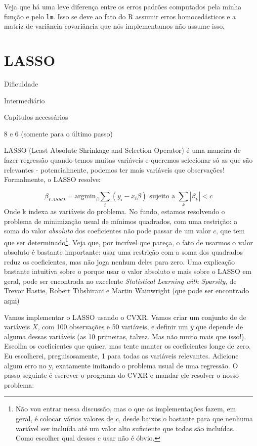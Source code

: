 \documentclass[
]{book}
\begin{document}
Veja que há uma leve diferença entre os erros padrões computados pela minha função e pelo \texttt{lm}. Isso se deve ao fato do R assumir erros homocedásticos e a matriz de variância covariância que nós implementamos não assume isso.

\hypertarget{lasso}{%
\section{LASSO}\label{lasso}}

Dificuldade

Intermediário

Capítulos necessários

8 e 6 (somente para o último passo)

LASSO (Least Absolute Shrinkage and Selection Operator) é uma maneira de fazer regressão quando temos muitas variáveis e queremos selecionar só as que são relevantes - potencialmente, podemos ter mais variáveis que observações! Formalmente, o LASSO resolve:

\[\beta_{LASSO} = \text{argmin}_\beta \sum_i (y_i - x_i\beta) \text{ sujeito a } \sum_k |\beta_k| < c\]
Onde k indexa as variáveis do problema. No fundo, estamos resolvendo o problema de minimização usual de mínimos quadrados, com uma restrição: a soma do valor \emph{absoluto} dos coeficientes não pode passar de um valor \(c\), que tem que ser determinado\footnote{Não vou entrar nessa discussão, mas o que as implementações fazem, em geral, é colocar vários valores de \(c\), desde baixos o bastante para que nenhuma variável ser incluída até um valor alto suficiente que todas são incluídas. Como escolher qual desses \(c\) usar não é óbvio.}. Veja que, por incrível que pareça, o fato de usarmos o valor absoluto é bastante importante: usar uma restrição com a soma dos quadrados reduz os coeficientes, mas não joga nenhum deles para zero. Uma explicação bastante intuitiva sobre o porque usar o valor absoluto e mais sobre o LASSO em geral, pode ser encontrada no excelente \emph{Statistical Learning with Sparsity}, de Trevor Hastie, Robert Tibshirani e Martin Wainwright (que pode ser encontrado \href{https://web.stanford.edu/~hastie/StatLearnSparsity_files/SLS_corrected_1.4.16.pdf}{aqui})

Vamos implementar o LASSO usando o CVXR. Vamos criar um conjunto de de variáveis \(X\), com 100 observações e 50 variáveis, e definir um \(y\) que depende de alguma dessas variáveis (as 10 primeiras, talvez. Mas não muito mais que isso!). Escolha os coeficientes que quiser, mas tente manter os coeficientes longe de zero. Eu escolherei, preguisosamente, 1 para todas as variáveis relevantes. Adicione algum erro no y, exatamente imitando o problema usual de uma regressão. O passo seguinte é escrever o programa do CVXR e mandar ele resolver o nosso problema:
\end{document}
